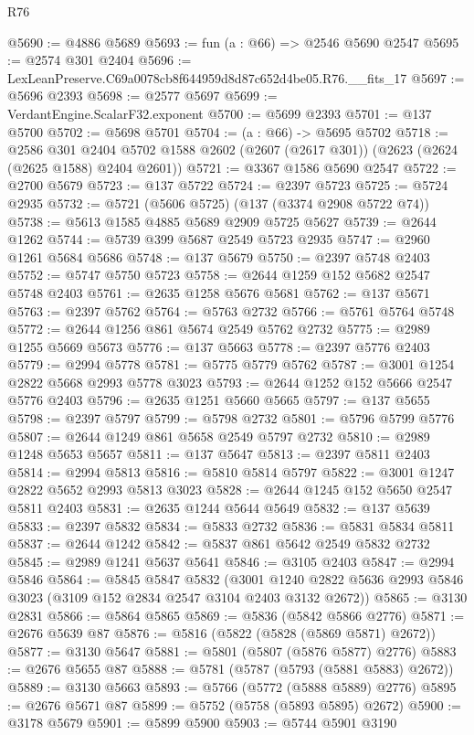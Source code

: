 \begin{lexlean}{R76}
\begin{coremodule}
@5690 := @4886 @5689
@5693 := fun (a : @66) => @2546 @5690 @2547
@5695 := @2574 @301 @2404
@5696 := LexLeanPreserve.C69a0078cb8f644959d8d87c652d4be05.R76.__fits_17
@5697 := @5696 @2393
@5698 := @2577 @5697
@5699 := VerdantEngine.ScalarF32.exponent
@5700 := @5699 @2393
@5701 := @137 @5700
@5702 := @5698 @5701
@5704 := (a : @66) -> @5695 @5702
@5718 := @2586
    @301
    @2404
    @5702
    @1588
    @2602
    (@2607 (@2617 @301))
    (@2623 (@2624 (@2625 @1588) @2404 @2601))
@5721 := @3367 @1586 @5690 @2547
@5722 := @2700 @5679
@5723 := @137 @5722
@5724 := @2397 @5723
@5725 := @5724 @2935
@5732 := @5721 (@5606 @5725) (@137 (@3374 @2908 @5722 @74))
@5738 := @5613 @1585 @4885 @5689 @2909 @5725 @5627
@5739 := @2644 @1262
@5744 := @5739 @399 @5687 @2549 @5723 @2935
@5747 := @2960 @1261 @5684 @5686
@5748 := @137 @5679
@5750 := @2397 @5748 @2403
@5752 := @5747 @5750 @5723
@5758 := @2644 @1259 @152 @5682 @2547 @5748 @2403
@5761 := @2635 @1258 @5676 @5681
@5762 := @137 @5671
@5763 := @2397 @5762
@5764 := @5763 @2732
@5766 := @5761 @5764 @5748
@5772 := @2644 @1256 @861 @5674 @2549 @5762 @2732
@5775 := @2989 @1255 @5669 @5673
@5776 := @137 @5663
@5778 := @2397 @5776 @2403
@5779 := @2994 @5778
@5781 := @5775 @5779 @5762
@5787 := @3001 @1254 @2822 @5668 @2993 @5778 @3023
@5793 := @2644 @1252 @152 @5666 @2547 @5776 @2403
@5796 := @2635 @1251 @5660 @5665
@5797 := @137 @5655
@5798 := @2397 @5797
@5799 := @5798 @2732
@5801 := @5796 @5799 @5776
@5807 := @2644 @1249 @861 @5658 @2549 @5797 @2732
@5810 := @2989 @1248 @5653 @5657
@5811 := @137 @5647
@5813 := @2397 @5811 @2403
@5814 := @2994 @5813
@5816 := @5810 @5814 @5797
@5822 := @3001 @1247 @2822 @5652 @2993 @5813 @3023
@5828 := @2644 @1245 @152 @5650 @2547 @5811 @2403
@5831 := @2635 @1244 @5644 @5649
@5832 := @137 @5639
@5833 := @2397 @5832
@5834 := @5833 @2732
@5836 := @5831 @5834 @5811
@5837 := @2644 @1242
@5842 := @5837 @861 @5642 @2549 @5832 @2732
@5845 := @2989 @1241 @5637 @5641
@5846 := @3105 @2403
@5847 := @2994 @5846
@5864 := @5845
    @5847
    @5832
    (@3001 @1240 @2822 @5636 @2993 @5846 @3023 (@3109 @152 @2834 @2547 @3104 @2403 @3132 @2672))
@5865 := @3130 @2831
@5866 := @5864 @5865
@5869 := @5836 (@5842 @5866 @2776)
@5871 := @2676 @5639 @87
@5876 := @5816 (@5822 (@5828 (@5869 @5871) @2672))
@5877 := @3130 @5647
@5881 := @5801 (@5807 (@5876 @5877) @2776)
@5883 := @2676 @5655 @87
@5888 := @5781 (@5787 (@5793 (@5881 @5883) @2672))
@5889 := @3130 @5663
@5893 := @5766 (@5772 (@5888 @5889) @2776)
@5895 := @2676 @5671 @87
@5899 := @5752 (@5758 (@5893 @5895) @2672)
@5900 := @3178 @5679
@5901 := @5899 @5900
@5903 := @5744 @5901 @3190

\end{coremodule}
\end{lexlean}
